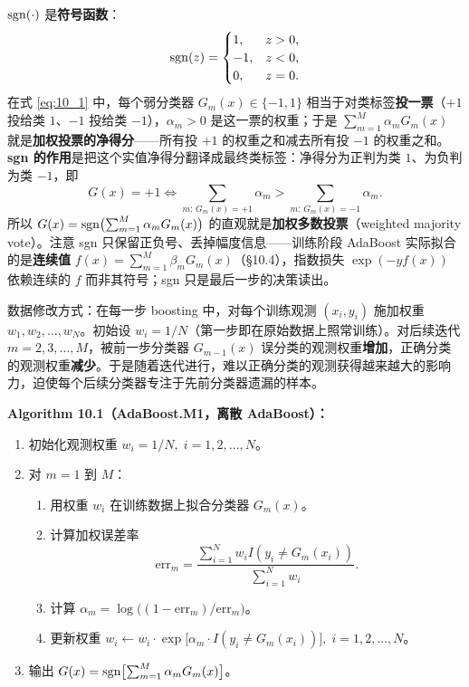 $\mathrm{sgn}(\cdot)$ 是\textbf{符号函数}：
\[
    \mathrm{sgn}(z) = \begin{cases} 1, & z > 0,\\ -1, & z < 0,\\ 0, & z = 0. \end{cases}
\]
在式 \eqref{eq:10_1} 中，每个弱分类器 $G_m(x) \in \{-1, 1\}$ 相当于对类标签\textbf{投一票}（$+1$ 投给类 $1$、$-1$ 投给类 $-1$），$\alpha_m > 0$ 是这一票的权重；于是 $\sum_{m=1}^{M} \alpha_m G_m(x)$ 就是\textbf{加权投票的净得分}——所有投 $+1$ 的权重之和减去所有投 $-1$ 的权重之和。\textbf{sgn 的作用}是把这个实值净得分翻译成最终类标签：净得分为正判为类 $1$、为负判为类 $-1$，即
\[
    G(x) = +1 \iff \sum_{m:\,G_m(x)=+1} \alpha_m > \sum_{m:\,G_m(x)=-1} \alpha_m.
\]
所以 $G(x) = \mathrm{sgn}\bigl(\sum_{m=1}^{M} \alpha_m G_m(x)\bigr)$ 的直观就是\textbf{加权多数投票}（weighted majority vote）。注意 sgn 只保留正负号、丢掉幅度信息——训练阶段 AdaBoost 实际拟合的是\textbf{连续值} $f(x) = \sum_{m=1}^{M} \beta_m G_m(x)$（§10.4），指数损失 $\exp(-y f(x))$ 依赖连续的 $f$ 而非其符号；sgn 只是最后一步的决策读出。

数据修改方式：在每一步 boosting 中，对每个训练观测 $(x_i, y_i)$ 施加权重 $w_1, w_2, \ldots, w_N$。初始设 $w_i = 1/N$（第一步即在原始数据上照常训练）。对后续迭代 $m = 2, 3, \ldots, M$，被前一步分类器 $G_{m-1}(x)$ 误分类的观测权重\textbf{增加}，正确分类的观测权重\textbf{减少}。于是随着迭代进行，难以正确分类的观测获得越来越大的影响力，迫使每个后续分类器专注于先前分类器遗漏的样本。

\textbf{Algorithm 10.1（AdaBoost.M1，离散 AdaBoost）：}
\begin{enumerate}
    \item 初始化观测权重 $w_i = 1/N,\; i = 1, 2, \ldots, N$。
    \item 对 $m = 1$ 到 $M$：
    \begin{enumerate}
        \item 用权重 $w_i$ 在训练数据上拟合分类器 $G_m(x)$。
        \item 计算加权误差率
        \begin{equation}\label{eq:10_errm}
            \mathrm{err}_m = \frac{\sum_{i=1}^{N} w_i I(y_i \neq G_m(x_i))}{\sum_{i=1}^{N} w_i}.
        \end{equation}
        \item 计算 $\alpha_m = \log\bigl((1 - \mathrm{err}_m)/\mathrm{err}_m\bigr)$。
        \item 更新权重 $w_i \leftarrow w_i \cdot \exp\bigl[\alpha_m \cdot I(y_i \neq G_m(x_i))\bigr],\; i = 1, 2, \ldots, N$。
    \end{enumerate}
    \item 输出 $G(x) = \mathrm{sgn}\bigl[\sum_{m=1}^{M} \alpha_m G_m(x)\bigr]$。
\end{enumerate}

